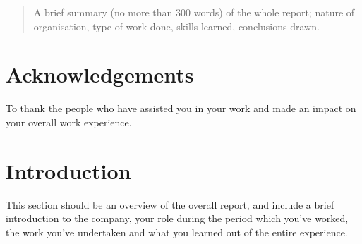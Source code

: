 \documentclass[pdftex, 12pt, a4paper, twoside]{article} %
\let\oldsection\section
\def\section{\clearpage\oldsection}
\begin{document}


\thispagestyle{plain} %

\setcounter{page}{2}


\renewcommand{\abstractname}{Summary}
\begin{abstract}


A brief summary (no more than 300 words) of the whole report; nature of organisation, type of work done, skills learned, conclusions drawn.
\lipsum[1-2]

\end{abstract}

\section*{Acknowledgements}


To thank the people who have assisted you in your work and made an impact on your overall work experience.
\lipsum[1-2]


\renewcommand{\contentsname}{Table of Contents}
\tableofcontents
{}
\listoffigures
{}
\listoftables
{}
\clearpage

\setcounter{page}{1}

\section{Introduction}
\label{sec:introduction}

This section should be an overview of the overall report, and include a brief introduction to the company, your role during the period which you've worked, the work you've undertaken and what you learned out of the entire experience.
\lipsum[1-2]
\end{document}
